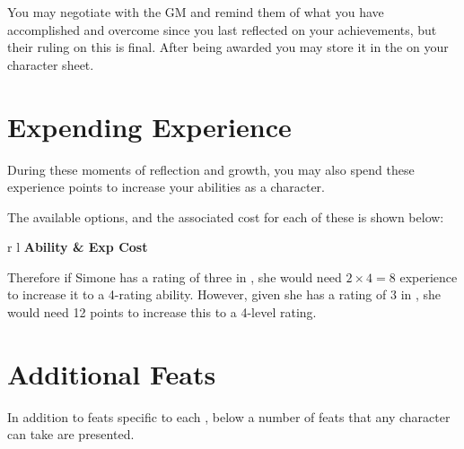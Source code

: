 	You may negotiate with the GM and remind them of what you have accomplished and overcome since you last reflected on your achievements, but their ruling on this is final. After being awarded  you may store it in the  on your character sheet. 
	
	
	\section{Expending Experience}
	
	During these moments of reflection and growth, you may also spend these experience points to increase your abilities as a character. 
	
	The available options, and the associated  cost for each of these is shown below:
	
	\begin{center}
		\begin{rndtable}{r l}
			\bf Ability	&	\bf Exp Cost
			\\
			\progressionCosts
		\end{rndtable}
	
	\end{center}
	
	Therefore if Simone has a rating of three in , she would need $2\times4 = 8$ experience to increase it to a 4-rating ability. However, given she has a rating of 3 in , she would need 12 points to increase this to a 4-level rating. 


	\section{Additional Feats} \label{S:AllFeats}
	
	In addition to feats specific to each , below a number of feats that any character can take are presented. 
	
	\AllFeats
